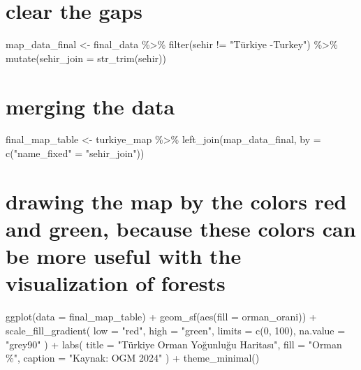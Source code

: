 \documentclass[
  11pt,
  a4paper,
  DIV=11,
  numbers=noendperiod]{scrartcl}
\newenvironment{Shaded}{\begin{snugshade}}{\end{snugshade}}
\newcommand{\AttributeTok}[1]{\textcolor[rgb]{0.40,0.45,0.13}{#1}}
\newcommand{\DecValTok}[1]{\textcolor[rgb]{0.68,0.00,0.00}{#1}}
\newcommand{\FunctionTok}[1]{\textcolor[rgb]{0.28,0.35,0.67}{#1}}
\newcommand{\NormalTok}[1]{\textcolor[rgb]{0.00,0.23,0.31}{#1}}
\newcommand{\OtherTok}[1]{\textcolor[rgb]{0.00,0.23,0.31}{#1}}
\newcommand{\SpecialCharTok}[1]{\textcolor[rgb]{0.37,0.37,0.37}{#1}}
\newcommand{\StringTok}[1]{\textcolor[rgb]{0.13,0.47,0.30}{#1}}
\begin{document}
\section{clear the gaps}\label{clear-the-gaps}

\begin{Shaded}
\begin{Highlighting}[]
\NormalTok{map\_data\_final }\OtherTok{\textless{}{-}}\NormalTok{ final\_data }\SpecialCharTok{\%\textgreater{}\%}
  \FunctionTok{filter}\NormalTok{(sehir }\SpecialCharTok{!=} \StringTok{"Türkiye {-}Turkey"}\NormalTok{) }\SpecialCharTok{\%\textgreater{}\%}
  \FunctionTok{mutate}\NormalTok{(}\AttributeTok{sehir\_join =} \FunctionTok{str\_trim}\NormalTok{(sehir))}
\end{Highlighting}
\end{Shaded}

\section{merging the data}\label{merging-the-data}

\begin{Shaded}
\begin{Highlighting}[]
\NormalTok{final\_map\_table }\OtherTok{\textless{}{-}}\NormalTok{ turkiye\_map }\SpecialCharTok{\%\textgreater{}\%}
  \FunctionTok{left\_join}\NormalTok{(map\_data\_final, }\AttributeTok{by =} \FunctionTok{c}\NormalTok{(}\StringTok{"name\_fixed"} \OtherTok{=} \StringTok{"sehir\_join"}\NormalTok{))}
\end{Highlighting}
\end{Shaded}

\section{drawing the map by the colors red and green, because these
colors can be more useful with the visualization of
forests}\label{drawing-the-map-by-the-colors-red-and-green-because-these-colors-can-be-more-useful-with-the-visualization-of-forests}

\begin{Shaded}
\begin{Highlighting}[]
\FunctionTok{ggplot}\NormalTok{(}\AttributeTok{data =}\NormalTok{ final\_map\_table) }\SpecialCharTok{+}
  \FunctionTok{geom\_sf}\NormalTok{(}\FunctionTok{aes}\NormalTok{(}\AttributeTok{fill =}\NormalTok{ orman\_orani)) }\SpecialCharTok{+}
  \FunctionTok{scale\_fill\_gradient}\NormalTok{(}
    \AttributeTok{low =} \StringTok{"red"}\NormalTok{, }
    \AttributeTok{high =} \StringTok{"green"}\NormalTok{, }
    \AttributeTok{limits =} \FunctionTok{c}\NormalTok{(}\DecValTok{0}\NormalTok{, }\DecValTok{100}\NormalTok{),}
    \AttributeTok{na.value =} \StringTok{"grey90"}
\NormalTok{  ) }\SpecialCharTok{+}
  \FunctionTok{labs}\NormalTok{(}
    \AttributeTok{title =} \StringTok{"Türkiye Orman Yoğunluğu Haritası"}\NormalTok{,}
    \AttributeTok{fill =} \StringTok{"Orman \%"}\NormalTok{,}
    \AttributeTok{caption =} \StringTok{"Kaynak: OGM 2024"}
\NormalTok{  ) }\SpecialCharTok{+}
  \FunctionTok{theme\_minimal}\NormalTok{()}
\end{Highlighting}
\end{Shaded}
\end{document}
